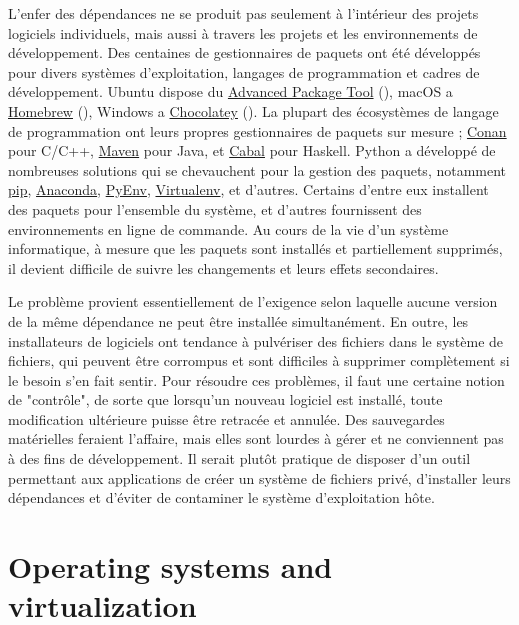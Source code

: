 L'enfer des dépendances ne se produit pas seulement à l'intérieur des projets logiciels individuels, mais aussi à travers les projets et les environnements de développement. Des centaines de gestionnaires de paquets ont été développés pour divers systèmes d'exploitation, langages de programmation et cadres de développement. Ubuntu dispose du \href{https://help.ubuntu.com/lts/serverguide/apt.html}{Advanced Package Tool} (), macOS a \href{https://brew.sh/}{Homebrew} (), Windows a \href{https://chocolatey.org/}{Chocolatey} (). La plupart des écosystèmes de langage de programmation ont leurs propres gestionnaires de paquets sur mesure ; \href{https://conan.io/}{Conan} pour C/C++, \href{https://maven.apache.org}{Maven} pour Java, et \href{https://www.haskell.org/cabal/}{Cabal} pour Haskell. Python a développé de nombreuses solutions qui se chevauchent pour la gestion des paquets, notamment \href{https://pypi.org/project/pip/}{pip}, \href{https://www.anaconda.com/}{Anaconda}, \href{https://github.com/pyenv/pyenv}{PyEnv}, \href{https://virtualenv.pypa.io/}{Virtualenv}, et d'autres. Certains d'entre eux installent des paquets pour l'ensemble du système, et d'autres fournissent des environnements en ligne de commande. Au cours de la vie d'un système informatique, à mesure que les paquets sont installés et partiellement supprimés, il devient difficile de suivre les changements et leurs effets secondaires.

Le problème provient essentiellement de l'exigence selon laquelle aucune version de la même dépendance ne peut être installée simultanément. En outre, les installateurs de logiciels ont tendance à pulvériser des fichiers dans le système de fichiers, qui peuvent être corrompus et sont difficiles à supprimer complètement si le besoin s'en fait sentir. Pour résoudre ces problèmes, il faut une certaine notion de "contrôle", de sorte que lorsqu'un nouveau logiciel est installé, toute modification ultérieure puisse être retracée et annulée. Des sauvegardes matérielles feraient l'affaire, mais elles sont lourdes à gérer et ne conviennent pas à des fins de développement. Il serait plutôt pratique de disposer d'un outil permettant aux applications de créer un système de fichiers privé, d'installer leurs dépendances et d'éviter de contaminer le système d'exploitation hôte.

\section{Operating systems and virtualization}\label{sec:os-and-virtualization}

